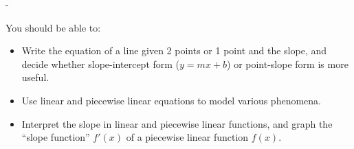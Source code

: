 \documentclass{article}
\makeatletter
\newlength{\tipmargin}
\renewenvironment{framed}{
  \setlength{\tipmargin}{\textwidth-\linewidth}
  \advance\@totalleftmargin-\tipmargin
  \def\FrameCommand{\hspace{\tipmargin}\fbox}%
  \advance\linewidth\tipmargin
  \MakeFramed {\advance\hsize-\width \FrameRestore}%
}
{\endMakeFramed}
\makeatother
\begin{document}

\begin{problemonly}
  \begin{framed}

You should be able to:
    \begin{itemize}[topsep=0pt,partopsep=0pt,parsep=8pt,itemsep=0pt] 
    \item Write the equation of a line given 2 points or 1 point and the
      slope, and decide whether slope-intercept form ($y = mx + b$) or
      point-slope form is more useful. 

    \item Use linear and piecewise linear equations to model various
      phenomena.

    \item Interpret the slope in linear and piecewise linear functions, 
      and graph the ``slope function'' $f'(x)$ of a piecewise linear
      function $f(x)$.  

    \end{itemize}
  \end{framed}
\end{problemonly}
\end{document}
